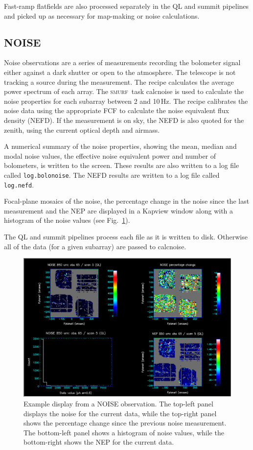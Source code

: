 \documentclass[twoside,11pt]{article}
\renewcommand{\_}{\texttt{\symbol{95}}}
\newcommand{\SMURF}{\textsc{smurf}}
\newcommand{\task}[1]{\textsf{#1}}
\begin{document}
Fast-ramp flatfields are also processed separately in the QL and
summit pipelines and picked up as necessary for map-making or noise
calculations.

\subsection{NOISE}

Noise observations are a series of measurements recording the
bolometer signal either against a dark shutter or open to the
atmosphere. The telescope is not tracking a source during the
measurement. The recipe calculates the average power spectrum of each
array. The \SMURF\ task \task{calcnoise} is used to calculate the
noise properties for each subarray between 2 and 10\,Hz. The recipe
calibrates the noise data using the appropriate FCF to calculate the
noise equivalent flux density (NEFD). If the measurement is on sky,
the NEFD is also quoted for the zenith, using the current optical
depth and airmass.

A numerical summary of the noise properties, showing the mean, median
and modal noise values, the effective noise equivalent power and
number of bolometers, is written to the screen. These results are also
written to a log file called \verb+log.bolonoise+. The NEFD results
are written to a log file called \verb+log.nefd+.

Focal-plane mosaics of the noise, the percentage change in the noise
since the last measurement and the NEP are displayed in a Kapview
window along with a histogram of the noise values (see
Fig.~\ref{fig:noise}).

The QL and summit pipelines process each file as it is written to
disk. Otherwise all of the data (for a given subarray) are passed to
\task{calcnoise}.

\begin{figure}[t]
\centering
\includegraphics[width=\textwidth]{sun264_noise.eps}
\caption{Example display from a NOISE observation. The top-left panel
  displays the noise for the current data, while the top-right panel
  shows the percentage change since the previous noise
  measurement. The bottom-left panel shows a histogram of noise
  values, while the bottom-right shows the NEP for the current
  data.\label{fig:noise}}
\end{figure}
\end{document}
